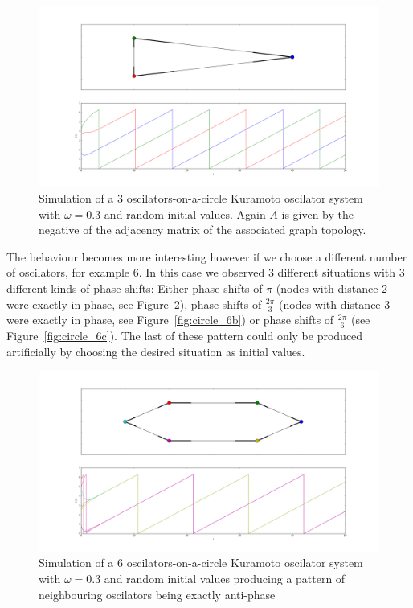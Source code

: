 \begin{figure}[h]
  \centering
  \includegraphics[width=\textwidth]{imgs/circle_3}
  \caption{Simulation of a 3 oscilators-on-a-circle Kuramoto oscilator system with $\omega = 0.3$ and random initial values. Again $A$ is given by the negative of the adjacency matrix of the associated graph topology. }
  \label{fig:circle_3}
\end{figure}

The behaviour becomes more interesting however if we choose a different number of oscilators, for example $6$. In this case we observed 3 different situations with 3 different kinds of phase shifts: Either phase shifts of $\pi$ (nodes with distance 2 were exactly in phase, see Figure~\ref{fig:circle_6a}), phase shifts of $\frac{2 \pi}{3}$ (nodes with distance 3 were exactly in phase, see Figure~\ref{fig:circle_6b}) or phase shifts of $\frac{2 \pi}{6}$ (see Figure~\ref{fig:circle_6c}). The last of these pattern could only be produced artificially by choosing the desired situation as initial values. 

\begin{figure}[h]
  \centering
  \includegraphics[width=\textwidth]{imgs/circle_6a}
  \caption{Simulation of a 6 oscilators-on-a-circle Kuramoto oscilator system with $\omega = 0.3$ and random initial values producing a pattern of neighbouring oscilators being exactly anti-phase}
  \label{fig:circle_6a}
\end{figure}

